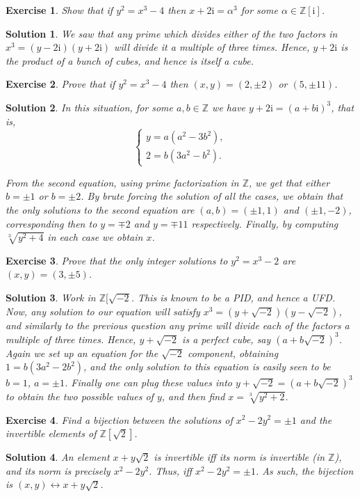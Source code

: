 \documentclass{article}
\newtheorem{ex}{Exercise}
\theoremstyle{nonumberplain}
\newtheorem{sol}{Solution}
\newcommand{\Z}{\mathbb{Z}}
\newcommand{\I}{\mathrm{i}}
\begin{document}
\begin{ex}
Show that if $y^2 = x^3 - 4$ then $x + 2 \I = \alpha^3$ for some $\alpha \in \Z[\I]$.
\end{ex}

\begin{sol}
We saw that any prime which divides either of the two factors in $x^3 = (y-2\I)(y+2\I)$ will divide it a multiple of three times. Hence, $y+2\I$ is the product of a bunch of cubes, and hence is itself a cube.
\end{sol}

\begin{ex}
Prove that if $y^2 = x^3 - 4$ then $(x,y) = (2, \pm2)$ or $(5,\pm 11)$.
\end{ex}

\begin{sol}
In this situation, for some $a,b\in \Z$ we have $y+2\I = (a+b\I)^3$, that is,
\begin{equation}
\begin{cases}
y = a(a^2 - 3b^2),\\
2 = b (3 a^2 - b^2).
\end{cases}
\end{equation}

From the second equation, using prime factorization in $\Z$, we get that either $b = \pm 1$ or $b = \pm 2$. By brute forcing the solution of all the cases, we obtain that the only solutions to the second equation are $(a,b) = (\pm 1,1)$ and $(\pm 1,-2)$, corresponding then to $y = \mp 2$ and $y = \mp 11$ respectively. Finally, by computing $\sqrt[3]{y^2 + 4}$ in each case we obtain $x$.
\end{sol}

\begin{ex}
Prove that the only integer solutions to $y^2 = x^3 - 2$ are $(x,y) = (3,\pm 5)$.
\end{ex}

\begin{sol}
Work in $\Z[\sqrt{-2}$. This is known to be a PID, and hence a UFD. Now, any solution to our equation will satisfy $x^3 = (y+\sqrt{-2})(y-\sqrt{-2})$, and similarly to the previous question any prime will divide each of the factors a multiple of three times. Hence, $y+\sqrt{-2}$ is a perfect cube, say $(a+b\sqrt{-2})^3$. Again we set up an equation for the $\sqrt{-2}$ component, obtaining $1 = b(3 a^2 - 2 b^2)$, and the only solution to this equation is easily seen to be $b = 1$, $a = \pm 1$. Finally one can plug these values into $y + \sqrt{-2} = (a+b\sqrt{-2})^3$ to obtain the two possible values of $y$, and then find $x = \sqrt[3]{y^2 + 2}$.
\end{sol}

\begin{ex}
Find a bijection between the solutions of $x^2 - 2 y^2 = \pm 1$ and the invertible elements of $\Z[\sqrt2]$.
\end{ex}

\begin{sol}
An element $x + y \sqrt 2$ is invertible iff its norm is invertible (in $\Z$), and its norm is precisely $x^2 - 2 y^2$. Thus, iff $x^2 - 2 y^2 = \pm 1$. As such, the bijection is $(x,y) \leftrightarrow x + y \sqrt 2$.
\end{sol}
\end{document}
